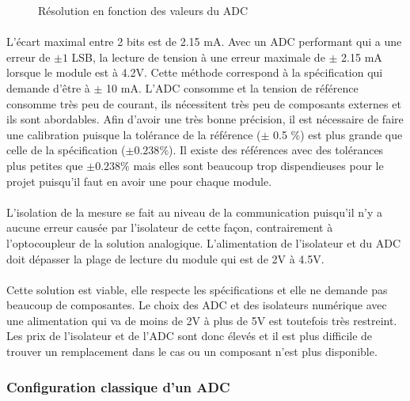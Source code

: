 \begin{figure}[H]
\begin{minipage}{0.45\textwidth}
			\caption{Résolution en fonction des valeurs du ADC}
			\label{fig:res_vref}
		\end{minipage}	
	\end{figure}	
	
	\paragraph*{}
	L'écart maximal entre 2 bits est de 2.15 mA. Avec un ADC performant qui a une erreur de $\pm 1$ LSB, la lecture de tension à une erreur maximale de $\pm $ 2.15 mA lorsque le module est à 4.2V. Cette méthode correspond à la spécification qui demande d'être à $\pm $ 10 mA. L'ADC consomme et la tension de référence consomme très peu de courant, ils nécessitent très peu de composants externes et ils sont abordables. Afin d'avoir une très bonne précision, il est nécessaire de faire une calibration puisque la tolérance de la référence ($\pm$ 0.5 \%) est plus grande que celle de la spécification ($\pm 0.238 \%$). Il existe des références avec des tolérances plus petites que $\pm 0.238 \%$ mais elles sont beaucoup trop dispendieuses pour le projet puisqu'il faut en avoir une pour chaque module.    
	
	\paragraph*{}
	L'isolation de la mesure se fait au niveau de la communication puisqu'il n'y a aucune erreur causée par l'isolateur de cette façon, contrairement à l'optocoupleur de la solution analogique. L'alimentation de l'isolateur et du ADC doit dépasser la plage de lecture du module qui est de 2V à 4.5V.
	
	\paragraph*{}
	Cette solution est viable, elle respecte les spécifications et elle ne demande pas beaucoup de composantes. Le choix des ADC et des isolateurs numérique avec une alimentation qui va de moins de 2V à plus de 5V est toutefois très restreint. Les prix de l'isolateur et de l'ADC sont donc élevés et il est plus difficile de trouver un remplacement dans le cas ou un composant n'est plus disponible.   
	
	\subsubsection*{Configuration classique d'un ADC}
